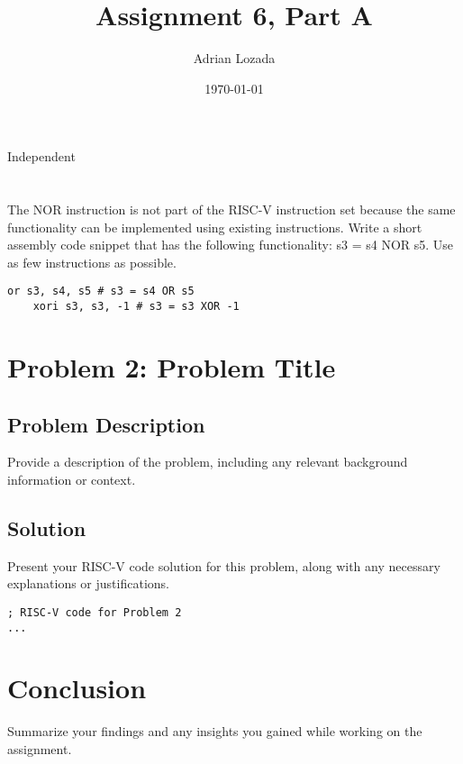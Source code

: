 \documentclass[12pt]{article}
\title{Assignment 6, Part A}
\author{Adrian Lozada}
\date{\today}
\begin{document}
\maketitle
\newpage

\section{}
Independent

\section{}
\begin{flushleft}
The NOR instruction is not part of the RISC-V instruction set because the same 
functionality can be implemented using existing instructions. Write a short assembly code 
snippet that has the following functionality: s3 = s4 NOR s5. Use as few instructions as 
possible.
\end{flushleft}
\begin{lstlisting}[language=RISCV]
    or s3, s4, s5 # s3 = s4 OR s5
    xori s3, s3, -1 # s3 = s3 XOR -1
\end{lstlisting}
    

\section{Problem 2: Problem Title}
\subsection{Problem Description}
Provide a description of the problem, including any relevant background information or context.

\subsection{Solution}
Present your RISC-V code solution for this problem, along with any necessary explanations or justifications.

\begin{verbatim}
; RISC-V code for Problem 2
...
\end{verbatim}

\section{Conclusion}
Summarize your findings and any insights you gained while working on the assignment.
\end{document}
